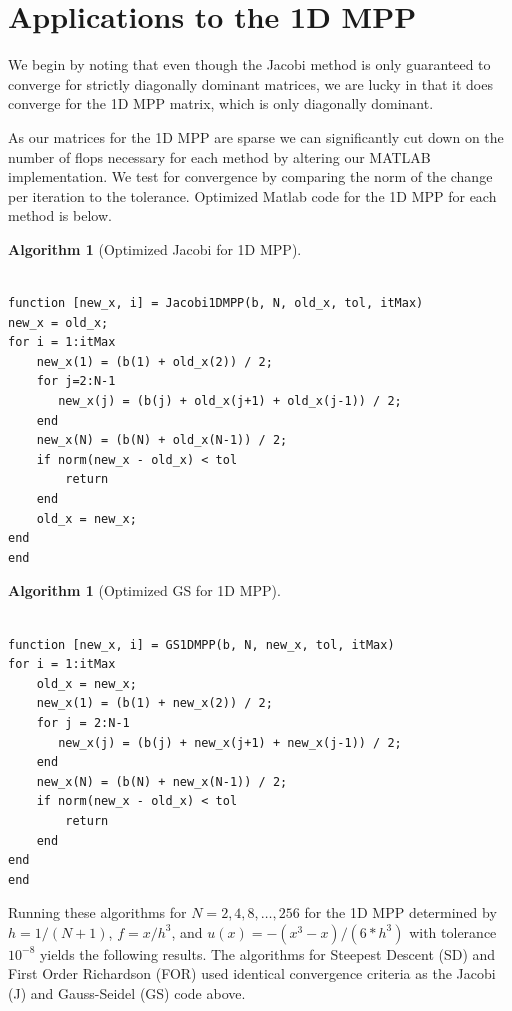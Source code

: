 \documentclass[12pt,letterpaper]{article}
\theoremstyle{definition}
\newtheorem{algorithm}[thm]{Algorithm}
\begin{document}
\section{Applications to the 1D MPP}

We begin by noting that even though the Jacobi method is only guaranteed to converge for strictly diagonally dominant matrices, we are lucky in that it does converge for the 1D MPP matrix, which is only diagonally dominant.

As our matrices for the 1D MPP are sparse we can significantly cut down on the number of flops necessary for each method by altering our MATLAB implementation. We test for convergence by comparing the norm of the change per iteration to the tolerance. Optimized Matlab code for the 1D MPP for each method is below. 

\begin{algorithm}[Optimized Jacobi for 1D MPP]
\begin{lstlisting}

function [new_x, i] = Jacobi1DMPP(b, N, old_x, tol, itMax)
new_x = old_x;
for i = 1:itMax
    new_x(1) = (b(1) + old_x(2)) / 2;
    for j=2:N-1
       new_x(j) = (b(j) + old_x(j+1) + old_x(j-1)) / 2;
    end
    new_x(N) = (b(N) + old_x(N-1)) / 2;
    if norm(new_x - old_x) < tol
        return
    end
    old_x = new_x;
end
end
\end{lstlisting}
\end{algorithm}
\begin{algorithm}[Optimized GS for 1D MPP]
\begin{lstlisting}

function [new_x, i] = GS1DMPP(b, N, new_x, tol, itMax)
for i = 1:itMax
    old_x = new_x;
    new_x(1) = (b(1) + new_x(2)) / 2;
    for j = 2:N-1
       new_x(j) = (b(j) + new_x(j+1) + new_x(j-1)) / 2;
    end
    new_x(N) = (b(N) + new_x(N-1)) / 2;
    if norm(new_x - old_x) < tol
        return
    end
end
end
\end{lstlisting}
\end{algorithm}

Running these algorithms for $N=2, 4, 8, \ldots, 256$ for the 1D MPP determined by $h=1/(N+1)$, $f=x/h^3$, and $u(x)=-(x^3-x)/(6*h^3)$ with tolerance $10^{-8}$ yields the following results. The algorithms for Steepest Descent (SD) and First Order Richardson (FOR) used identical convergence criteria as the Jacobi (J) and Gauss-Seidel (GS) code above.\\
\end{document}
